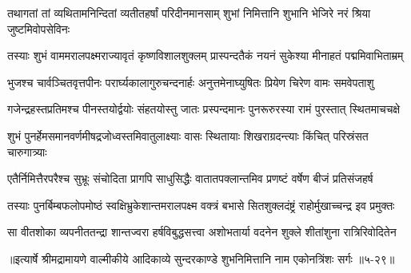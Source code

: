 
\twolineshloka
{तथागतां तां व्यथितामनिन्दितां व्यतीतहर्षां परिदीनमानसाम्}
{शुभां निमित्तानि शुभानि भेजिरे नरं श्रिया जुष्टमिवोपसेविनः} %

\twolineshloka
{तस्याः शुभं वाममरालपक्ष्मराज्यावृतं कृष्णविशालशुक्लम्}
{प्रास्पन्दतैकं नयनं सुकेश्या मीनाहतं पद्ममिवाभिताम्रम्} %

\twolineshloka
{भुजश्च चार्वञ्चितवृत्तपीनः परार्घ्यकालागुरुचन्दनार्हः}
{अनुत्तमेनाघ्युषितः प्रियेण चिरेण वामः समवेपताशु} %

\twolineshloka
{गजेन्द्रहस्तप्रतिमश्च पीनस्तयोर्द्वयोः संहतयोस्तु जातः}
{प्रस्पन्दमानः पुनरूरुरस्या रामं पुरस्तात् स्थितमाचचक्षे} %

\twolineshloka
{शुभं पुनर्हेमसमानवर्णमीषद्रजोध्वस्तमिवातुलाक्ष्याः}
{वासः स्थितायाः शिखराग्रदन्त्याः किंचित् परिस्रंसत चारुगात्र्याः} %

\twolineshloka
{एतैर्निमित्तैरपरैश्च सुभ्रूः संचोदिता प्रागपि साधुसिद्धैः}
{वातातपक्लान्तमिव प्रणष्टं वर्षेण बीजं प्रतिसंजहर्ष} %

\twolineshloka
{तस्याः पुनर्बिम्बफलोपमोष्ठं स्वक्षिभ्रुकेशान्तमरालपक्ष्म}
{वक्त्रं बभासे सितशुक्लदंष्ट्रं राहोर्मुखाच्चन्द्र इव प्रमुक्तः} %

\twolineshloka
{सा वीतशोका व्यपनीततन्द्रा शान्तज्वरा हर्षविबुद्धसत्त्वा}
{अशोभतार्या वदनेन शुक्ले शीतांशुना रात्रिरिवोदितेन} %


॥इत्यार्षे श्रीमद्रामायणे वाल्मीकीये आदिकाव्ये सुन्दरकाण्डे शुभनिमित्तानि नाम एकोनत्रिंशः सर्गः ॥५-२९॥
